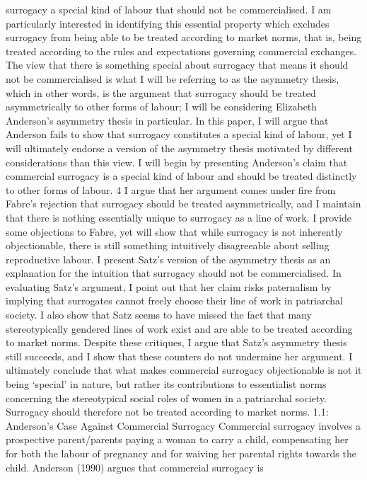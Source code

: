 surrogacy a special kind of labour that should not be commercialised. I
am particularly interested in identifying this essential property which
excludes surrogacy from being able to be treated according to market
norms, that is, being treated according to the rules and expectations
governing commercial exchanges. The view that there is something special
about surrogacy that means it should not be commercialised is what I
will be referring to as the asymmetry thesis, which in other words, is
the argument that surrogacy should be treated asymmetrically to other
forms of labour; I will be considering Elizabeth Anderson's asymmetry
thesis in particular. In this paper, I will argue that Anderson fails to
show that surrogacy constitutes a special kind of labour, yet I will
ultimately endorse a version of the asymmetry thesis motivated by
different considerations than this view. I will begin by presenting
Anderson's claim that commercial surrogacy is a special kind of labour
and should be treated distinctly to other forms of labour. 4 I argue
that her argument comes under fire from Fabre's rejection that surrogacy
should be treated asymmetrically, and I maintain that there is nothing
essentially unique to surrogacy as a line of work. I provide some
objections to Fabre, yet will show that while surrogacy is not
inherently objectionable, there is still something intuitively
disagreeable about selling reproductive labour. I present Satz's version
of the asymmetry thesis as an explanation for the intuition that
surrogacy should not be commercialised. In evaluating Satz's argument, I
point out that her claim risks paternalism by implying that surrogates
cannot freely choose their line of work in patriarchal society. I also
show that Satz seems to have missed the fact that many stereotypically
gendered lines of work exist and are able to be treated according to
market norms. Despite these critiques, I argue that Satz's asymmetry
thesis still succeeds, and I show that these counters do not undermine
her argument. I ultimately conclude that what makes commercial surrogacy
objectionable is not it being `special' in nature, but rather its
contributions to essentialist norms concerning the stereotypical social
roles of women in a patriarchal society. Surrogacy should therefore not
be treated according to market norms. 1.1: Anderson's Case Against
Commercial Surrogacy Commercial surrogacy involves a prospective
parent/parents paying a woman to carry a child, compensating her for
both the labour of pregnancy and for waiving her parental rights towards
the child. Anderson (1990) argues that commercial surrogacy is

